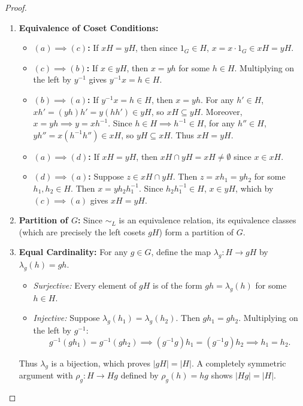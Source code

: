 \begin{proof}
\begin{enumerate}[label=\textbf{(\roman*)}, leftmargin=*, itemsep=8pt]
    \item \textbf{Equivalence of Coset Conditions:}
    \begin{itemize}[leftmargin=1.5em, itemsep=4pt]
        \item \textbf{$(a) \implies (c)$:} If $xH = yH$, then since $1_G \in H$, $x = x \cdot 1_G \in xH = yH$.
        \item \textbf{$(c) \implies (b)$:} If $x \in yH$, then $x = yh$ for some $h \in H$. Multiplying on the left by $y^{-1}$ gives $y^{-1}x = h \in H$.
        \item \textbf{$(b) \implies (a)$:} If $y^{-1}x = h \in H$, then $x = yh$.
        For any $h' \in H$, $xh' = (yh)h' = y(hh') \in yH$, so $xH \subseteq yH$.
        Moreover, $x = yh \implies y = xh^{-1}$. Since $h \in H \implies h^{-1} \in H$, for any $h'' \in H$, $yh'' = x(h^{-1}h'') \in xH$, so $yH \subseteq xH$.
        Thus $xH = yH$.
        \item \textbf{$(a) \implies (d)$:} If $xH = yH$, then $xH \cap yH = xH \ne \emptyset$ since $x \in xH$.
        \item \textbf{$(d) \implies (a)$:} Suppose $z \in xH \cap yH$. Then $z = xh_1 = yh_2$ for some $h_1, h_2 \in H$.
        Then $x = yh_2 h_1^{-1}$. Since $h_2 h_1^{-1} \in H$, $x \in yH$, which by $(c) \implies (a)$ gives $xH = yH$.
    \end{itemize}

    \item \textbf{Partition of $G$:}
    Since $\sim_L$ is an equivalence relation, its equivalence classes (which are precisely the left cosets $gH$) form a partition of $G$.

    \item \textbf{Equal Cardinality:}
    For any $g \in G$, define the map $\lambda_g: H \to gH$ by $\lambda_g(h) = gh$.
    \begin{itemize}[leftmargin=1.5em, itemsep=4pt]
        \item \emph{Surjective:} Every element of $gH$ is of the form $gh = \lambda_g(h)$ for some $h \in H$.
        \item \emph{Injective:} Suppose $\lambda_g(h_1) = \lambda_g(h_2)$. Then $gh_1 = gh_2$.
        Multiplying on the left by $g^{-1}$:
        \begin{equation*}
        g^{-1}(gh_1) = g^{-1}(gh_2) \implies (g^{-1}g)h_1 = (g^{-1}g)h_2 \implies h_1 = h_2.
        \end{equation*}
    \end{itemize}
    Thus $\lambda_g$ is a bijection, which proves $|gH| = |H|$.
    A completely symmetric argument with $\rho_g: H \to Hg$ defined by $\rho_g(h) = hg$ shows $|Hg| = |H|$.
\end{enumerate}
\end{proof}

